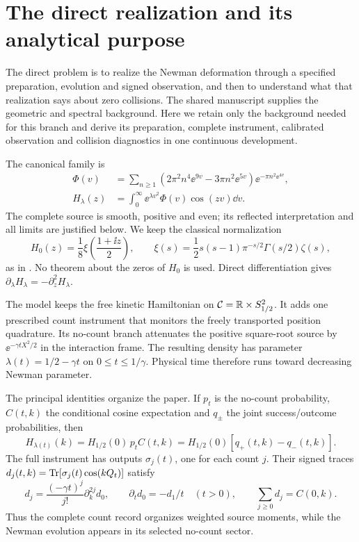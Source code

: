 \section{The direct realization and its analytical purpose}\label{sec:intro}

The direct problem is to realize the Newman deformation through a specified
preparation, evolution and signed observation, and then to understand what
that realization says about zero collisions. The shared manuscript
\cite{TNDBackground} supplies the geometric and spectral background. Here we
retain only the background needed for this branch and derive its preparation,
complete instrument, calibrated observation and collision diagnostics in one
continuous development.

The canonical family is
\begin{align}
 \Phi(v)&=\sum_{n\ge1}(2\pi^2n^4\ee^{9v}-3\pi n^2\ee^{5v})
                       \ee^{-\pi n^2\ee^{4v}},\label{eq:Phi}\\
 H_\lambda(z)&=\int_0^\infty\ee^{\lambda v^2}\Phi(v)\cos(zv)\dd v.
 \label{eq:H}
\end{align}
The complete source is smooth, positive and even; its reflected interpretation
and all limits are justified below. We keep the classical normalization
\begin{equation}\label{eq:xi}
 H_0(z)=\frac18\xi\!\left(\frac{1+\ii z}{2}\right),\qquad
 \xi(s)=\frac12s(s-1)\pi^{-s/2}\Gamma(s/2)\zeta(s),
\end{equation}
as in \cite[Introduction, (1)--(4)]{RodgersTao2020}. No theorem about the
zeros of $H_0$ is used. Direct differentiation gives
$\partial_\lambda H_\lambda=-\partial_z^2H_\lambda$.

The model keeps the free kinetic Hamiltonian on
$\mathcal C=\mathbb R\times S^2_{1/2}$. It adds one prescribed count instrument
that monitors the freely transported position quadrature. Its no-count
branch attenuates the positive square-root source by
$\ee^{-\gamma tX^2/2}$ in the interaction frame. The resulting density has
parameter $\lambda(t)=1/2-\gamma t$ on $0\le t\le1/\gamma$.
Physical time therefore runs toward decreasing Newman parameter.

The principal identities organize the paper. If $p_t$ is the no-count
probability, $C(t,k)$ the conditional cosine expectation and $q_\pm$ the joint
success/outcome probabilities, then
\begin{equation}\label{eq:mainintro}
 H_{\lambda(t)}(k)=H_{1/2}(0)\,p_t C(t,k)
                 =H_{1/2}(0)[q_+(t,k)-q_-(t,k)].
\end{equation}
The full instrument has outputs $\sigma_j(t)$, one for each count $j$.
Their signed traces $d_j(t,k)=\operatorname{Tr}[\sigma_j(t)\cos(kQ_t)]$ satisfy
\begin{equation}\label{eq:countintro}
 d_j=\frac{(-\gamma t)^j}{j!}\partial_k^{2j}d_0,\qquad
 \partial_td_0=-d_1/t\quad(t>0),\qquad
 \sum_{j\ge0}d_j=C(0,k).
\end{equation}
Thus the complete count record organizes weighted source moments, while the
Newman evolution appears in its selected no-count sector.

